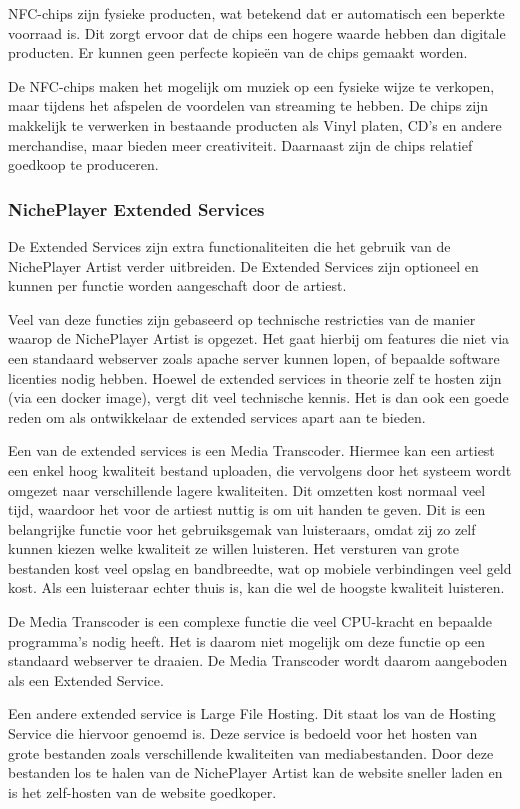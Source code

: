 NFC-chips zijn fysieke producten, wat betekend dat er automatisch een beperkte voorraad is. Dit zorgt ervoor dat de chips een hogere waarde hebben dan digitale producten. Er kunnen geen perfecte kopieën van de chips gemaakt worden.

De NFC-chips maken het mogelijk om muziek op een fysieke wijze te verkopen, maar tijdens het afspelen de voordelen van streaming te hebben. De chips zijn makkelijk te verwerken in bestaande producten als Vinyl platen, CD's en andere merchandise, maar bieden meer creativiteit. Daarnaast zijn de chips relatief goedkoop te produceren.

\subsubsection*{NichePlayer Extended Services}
De Extended Services zijn extra functionaliteiten die het gebruik van de NichePlayer Artist verder uitbreiden. De Extended Services zijn optioneel en kunnen per functie worden aangeschaft door de artiest.

Veel van deze functies zijn gebaseerd op technische restricties van de manier waarop de NichePlayer Artist is opgezet. Het gaat hierbij om features die niet via een standaard webserver zoals apache server kunnen lopen, of bepaalde software licenties nodig hebben. Hoewel de extended services in theorie zelf te hosten zijn (via een docker image), vergt dit veel technische kennis. Het is dan ook een goede reden om als ontwikkelaar de extended services apart aan te bieden.

Een van de extended services is een Media Transcoder. Hiermee kan een artiest een enkel hoog kwaliteit bestand uploaden, die vervolgens door het systeem wordt omgezet naar verschillende lagere kwaliteiten. Dit omzetten kost normaal veel tijd, waardoor het voor de artiest nuttig is om uit handen te geven. Dit is een belangrijke functie voor het gebruiksgemak van luisteraars, omdat zij zo zelf kunnen kiezen welke kwaliteit ze willen luisteren. Het versturen van grote bestanden kost veel opslag en bandbreedte, wat op mobiele verbindingen veel geld kost. Als een luisteraar echter thuis is, kan die wel de hoogste kwaliteit luisteren.

De Media Transcoder is een complexe functie die veel CPU-kracht en bepaalde programma's  nodig heeft. Het is daarom niet mogelijk om deze functie op een standaard webserver te draaien. De Media Transcoder wordt daarom aangeboden als een Extended Service.

Een andere extended service is Large File Hosting. Dit staat los van de Hosting Service die hiervoor genoemd is. Deze service is bedoeld voor het hosten van grote bestanden zoals verschillende kwaliteiten van mediabestanden. Door deze bestanden los te halen van de NichePlayer Artist kan de website sneller laden en is het zelf-hosten van de website goedkoper.

